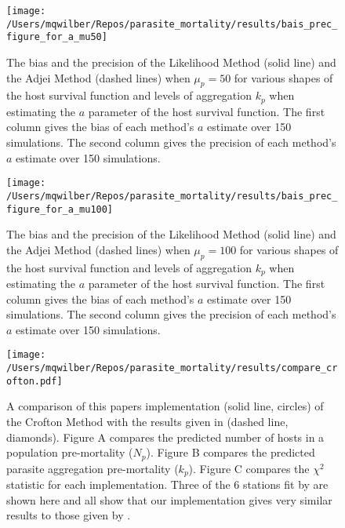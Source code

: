 \documentclass[12pt, a4paper]{article}
\begin{document}
\begin{figure}

    \texttt{[image: /Users/mqwilber/Repos/parasite\_mortality/results/bais\_prec\_figure\_for\_a\_mu50]}

    \caption{The bias and the precision of the Likelihood Method (solid line) and the Adjei Method (dashed lines) when $\mu_p = 50$ for various shapes of the host survival function and levels of aggregation $k_p$ when estimating the $a$ parameter of the host survival function.  The first column gives the bias of each method's $a$ estimate over 150 simulations. The second column gives the precision of each method's $a$ estimate over 150 simulations.}

    \label{fig:biasa_50}

\end{figure}

\begin{figure}

    \texttt{[image: /Users/mqwilber/Repos/parasite\_mortality/results/bais\_prec\_figure\_for\_a\_mu100]}

    \caption{The bias and the precision of the Likelihood Method (solid line) and the Adjei Method (dashed lines) when $\mu_p = 100$ for various shapes of the host survival function and levels of aggregation $k_p$ when estimating the $a$ parameter of the host survival function.  The first column gives the bias of each method's $a$ estimate over 150 simulations. The second column gives the precision of each method's $a$ estimate over 150 simulations.}

    \label{fig:biasa_100}

\end{figure}

\begin{figure}
    \centering
    \texttt{[image: /Users/mqwilber/Repos/parasite\_mortality/results/compare\_crofton.pdf]}
    \caption{A comparison of this papers implementation (solid line, circles) of the Crofton Method with the results given in \cite{Crofton1971a} (dashed line, diamonds).  Figure A compares the predicted number of hosts in a population pre-mortality ($N_p$). Figure B compares the predicted parasite aggregation pre-mortality ($k_p$).  Figure C compares the $\chi^2$ statistic for each implementation.  Three of the 6 stations fit by \citeauthor{Crofton1971a} are shown here and all show that our implementation gives very similar results to those given by \citeauthor{Crofton1971a}.}
    \label{fig:crof_test}

\end{figure}



\singlespacing


\end{document}

